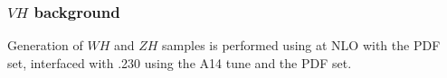 \documentclass[../thesis.tex]{subfiles}
\begin{document}
\subsubsection*{$VH$ background}
Generation of $WH$ and $ZH$ samples is performed using \powhegbox \citep{Frixione:2007nw,Nason:2004rx,Frixione:2007vw,Alioli:2010xd} at \acs{NLO} with the \nnpdfaznlo \citep{Ball:2014uwa} \acs{PDF} set, interfaced with \pythia.230 \citep{Sjostrand:2014zea} using the A14 tune \citep{ATL-PHYS-PUB-2014-021} and the \nnpdftwo \citep{Ball:2012cx} \acs{PDF} set.
\end{document}
